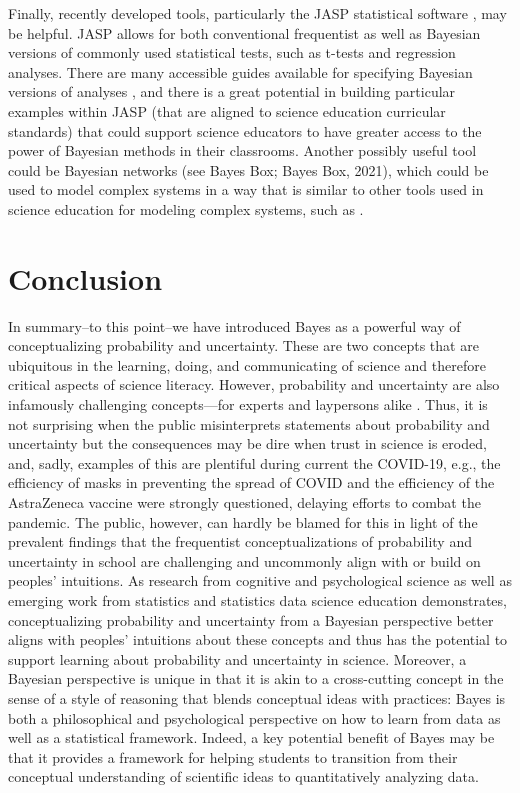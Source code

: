 \documentclass[man]{apa7}
\begin{document}
Finally, recently developed tools, particularly the JASP statistical software \parencite{JASP2020}, may be helpful. JASP allows for both conventional frequentist as well as Bayesian versions of commonly used statistical tests, such as t-tests and regression analyses. There are many accessible guides available for specifying Bayesian versions of analyses \parencite{v20, wagenmakers2018bayesian}, and there is a great potential in building particular examples within JASP (that are aligned to science education curricular standards) that could support science educators to have greater access to the power of Bayesian methods in their classrooms. Another possibly useful tool could be Bayesian networks (see Bayes Box; Bayes Box, 2021), which could be used to model complex systems in a way that is similar to other tools used in science education for modeling complex systems, such as \textcite{20}.

\section{Conclusion}

In summary--to this point--we have introduced Bayes as a powerful way of conceptualizing probability and uncertainty. These are two concepts that are ubiquitous in the learning, doing, and communicating of science and therefore critical aspects of science literacy. However, probability and uncertainty are also infamously challenging concepts—for experts and laypersons alike \parencite{gkv04, s07, tk74}. Thus, it is not surprising when the public misinterprets statements about probability and uncertainty but the consequences may be dire when trust in science is eroded, and, sadly, examples of this are plentiful during current the COVID-19, e.g., the efficiency of masks in preventing the spread of COVID and the efficiency of the AstraZeneca vaccine were strongly questioned, delaying efforts to combat the pandemic. The public, however, can hardly be blamed for this in light of the prevalent findings that the frequentist conceptualizations of probability and uncertainty in school are challenging and uncommonly align with or build on peoples’ intuitions. As research from cognitive and psychological science as well as emerging work from statistics and statistics data science education demonstrates, conceptualizing probability and uncertainty from a Bayesian perspective better aligns with peoples’ intuitions \parencite{kl18, so12} about these concepts and thus has the potential to support learning about probability and uncertainty in science. Moreover, a Bayesian perspective is unique in that it is akin to a cross-cutting concept in the sense of a style of reasoning \parencite{so12, ork18} that blends conceptual ideas with practices: Bayes is both a philosophical and psychological perspective on how to learn from data as well as a statistical framework. Indeed, a key potential benefit of Bayes may be that it provides a framework for helping students to transition from their conceptual understanding of scientific ideas to quantitatively analyzing data.  
\end{document}
